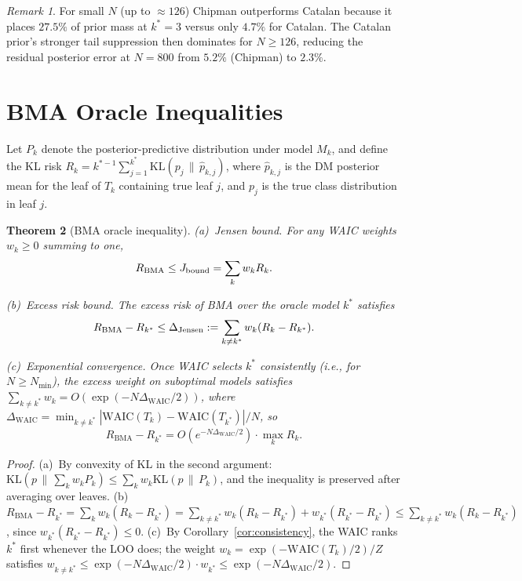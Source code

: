 \documentclass[ba]{imsart}
\theoremstyle{plain}
\newtheorem{theorem}{Theorem}[section]
\theoremstyle{definition}
\theoremstyle{remark}
\newtheorem{remark}[theorem]{Remark}
\newcommand{\waic}{\mathrm{WAIC}}
\newcommand{\kl}{\mathrm{KL}}
\newcommand{\Nmin}{N_{\min}}
\newcommand{\Rbma}{R_{\mathrm{BMA}}}
\newcommand{\Rora}{R_{k^*}}
\begin{document}
\begin{remark}
For small $N$ (up to $\approx 126$) Chipman outperforms Catalan because it places
$27.5\%$ of prior mass at $k^*=3$ versus only $4.7\%$ for Catalan.
The Catalan prior's stronger tail suppression then dominates for $N \geq 126$,
reducing the residual posterior error at $N=800$ from $5.2\%$ (Chipman) to $2.3\%$.
\end{remark}

\section{BMA Oracle Inequalities}
\label{sec:bma}

Let $P_k$ denote the posterior-predictive distribution under model $M_k$,
and define the KL risk $R_k = k^{*-1}\sum_{j=1}^{k^*}\kl(p_j\,\|\,\hat{p}_{k,j})$,
where $\hat{p}_{k,j}$ is the DM posterior mean for the leaf of $T_k$ containing
true leaf $j$, and $p_j$ is the true class distribution in leaf $j$.

\begin{theorem}[BMA oracle inequality]\label{thm:oracle}
\textup{(a)}~\emph{Jensen bound.}
For any WAIC weights $w_k \geq 0$ summing to one,
\begin{equation}
  \Rbma \leq J_{\rm bound} = \sum_k w_k R_k.
  \label{eq:jensen}
\end{equation}

\textup{(b)}~\emph{Excess risk bound.}
The excess risk of BMA over the oracle model $k^*$ satisfies
\begin{equation}
  \Rbma - \Rora \leq \Delta_{\rm Jensen}
  := \sum_{k \neq k^*} w_k (R_k - \Rora).
  \label{eq:excess}
\end{equation}

\textup{(c)}~\emph{Exponential convergence.}
Once WAIC selects $k^*$ consistently (i.e., for $N \geq \Nmin$),
the excess weight on suboptimal models satisfies
$\sum_{k \neq k^*} w_k = O(\exp(-N\Delta_{\waic}/2))$,
where $\Delta_{\waic} = \min_{k \neq k^*}|\waic(T_k) - \waic(T_{k^*})|/N$,
so
\begin{equation}
  \Rbma - \Rora = O\!\left(e^{-N\Delta_{\waic}/2}\right) \cdot \max_k R_k.
  \label{eq:exp_converge}
\end{equation}
\end{theorem}

\begin{proof}
(a)~By convexity of KL in the second argument:
$\kl(p\,\|\,\sum_k w_k P_k) \leq \sum_k w_k\kl(p\,\|\,P_k)$,
and the inequality is preserved after averaging over leaves.
(b)~$\Rbma - \Rora = \sum_k w_k(R_k - \Rora) = \sum_{k \neq k^*} w_k(R_k-\Rora)
+ w_{k^*}(R_{k^*}-\Rora) \leq \sum_{k\neq k^*}w_k(R_k-\Rora)$,
since $w_{k^*}(R_{k^*}-\Rora) \leq 0$.
(c)~By Corollary~\ref{cor:consistency}, the WAIC ranks $k^*$ first whenever the
LOO does; the weight $w_k = \exp(-\waic(T_k)/2)/Z$ satisfies
$w_{k \neq k^*} \leq \exp(-N\Delta_{\waic}/2) \cdot w_{k^*} \leq \exp(-N\Delta_{\waic}/2)$.
\end{proof}
\end{document}
